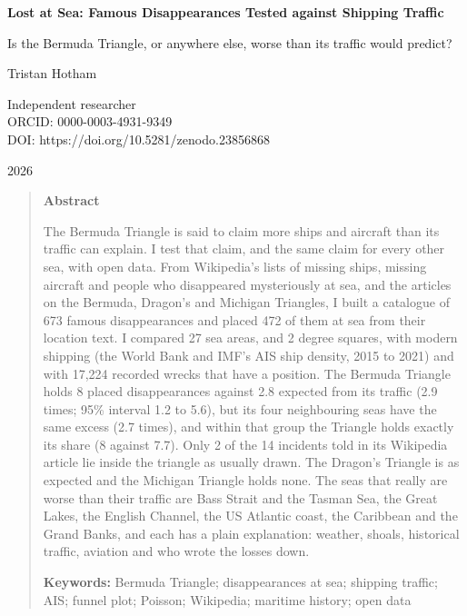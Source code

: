 \documentclass[11pt,a4paper]{article}
\begin{document}
\begin{center}
{\Large\bfseries Lost at Sea: Famous Disappearances Tested against Shipping Traffic\par}
\vspace{0.4em}
{\large Is the Bermuda Triangle, or anywhere else, worse than its traffic would predict?\par}
\vspace{1.2em}
{\large Tristan Hotham\par}
\vspace{0.3em}
{\small Independent researcher\\
ORCID: 0000-0003-4931-9349\\
DOI: https://doi.org/10.5281/zenodo.23856868\par}
\vspace{0.8em}
2026
\end{center}

\begin{quote}
\small
\begin{center}\textbf{Abstract}\end{center}
The Bermuda Triangle is said to claim more ships and aircraft than its traffic can explain. I test that claim, and the same claim for every other sea, with open data. From Wikipedia's lists of missing ships, missing aircraft and people who disappeared mysteriously at sea, and the articles on the Bermuda, Dragon's and Michigan Triangles, I built a catalogue of 673 famous disappearances and placed 472 of them at sea from their location text. I compared 27 sea areas, and 2 degree squares, with modern shipping (the World Bank and IMF's AIS ship density, 2015 to 2021) and with 17,224 recorded wrecks that have a position. The Bermuda Triangle holds 8 placed disappearances against 2.8 expected from its traffic (2.9 times; 95\% interval 1.2 to 5.6), but its four neighbouring seas have the same excess (2.7 times), and within that group the Triangle holds exactly its share (8 against 7.7). Only 2 of the 14 incidents told in its Wikipedia article lie inside the triangle as usually drawn. The Dragon's Triangle is as expected and the Michigan Triangle holds none. The seas that really are worse than their traffic are Bass Strait and the Tasman Sea, the Great Lakes, the English Channel, the US Atlantic coast, the Caribbean and the Grand Banks, and each has a plain explanation: weather, shoals, historical traffic, aviation and who wrote the losses down.

\textbf{Keywords:} Bermuda Triangle; disappearances at sea; shipping traffic; AIS; funnel plot; Poisson; Wikipedia; maritime history; open data
\end{quote}
\end{document}

